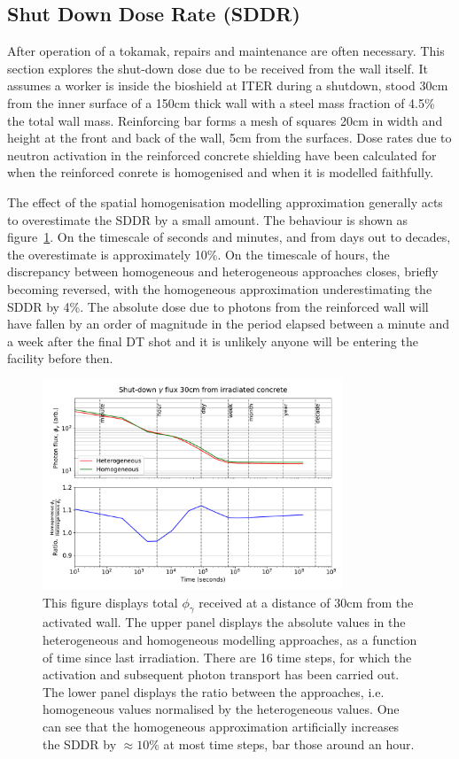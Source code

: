 \FloatBarrier
\subsection{Shut Down Dose Rate (SDDR)}
\label{subsec:sddr}
After operation of a tokamak, repairs and maintenance are often necessary. This section explores the shut-down dose due to be received from the wall itself. It assumes a worker is inside the bioshield at ITER during a shutdown, stood 30cm from the inner surface of a 150cm thick wall with a steel mass fraction of 4.5\% the total wall mass. Reinforcing bar forms a mesh of squares 20cm in width and height at the front and back of the wall, 5cm from the surfaces. Dose rates due to neutron activation in the reinforced concrete shielding have been calculated for when the reinforced conrete is homogenised and when it is modelled faithfully.

The effect of the spatial homogenisation modelling approximation generally acts to overestimate the SDDR by a small amount. The behaviour is shown as figure~\ref{fig:sddr}. On the timescale of seconds and minutes, and from days out to decades, the overestimate is approximately 10\%. On the timescale of hours, the discrepancy between homogeneous and heterogeneous approaches closes, briefly becoming reversed, with the homogeneous approximation underestimating the SDDR by 4\%. The absolute dose due to photons from the reinforced wall will have fallen by an order of magnitude in the period elapsed between a minute and a week after the final DT shot and it is unlikely anyone will be entering the facility before then.

\begin{figure}[H]
  \centering
  \includegraphics[width=0.8\textwidth]{sddr}
  \caption{This figure displays total $\phi_{\gamma}$ received at a distance of 30cm from the activated wall. The upper panel displays the absolute values in the heterogeneous and homogeneous modelling approaches, as a function of time since last irradiation. There are 16 time steps, for which the activation and subsequent photon transport has been carried out. The lower panel displays the ratio between the approaches, i.e. homogeneous values normalised by the heterogeneous values. One can see that the homogeneous approximation artificially increases the SDDR by $\approx 10\%$ at most time steps, bar those around an hour.}
  \label{fig:sddr}
\end{figure}

